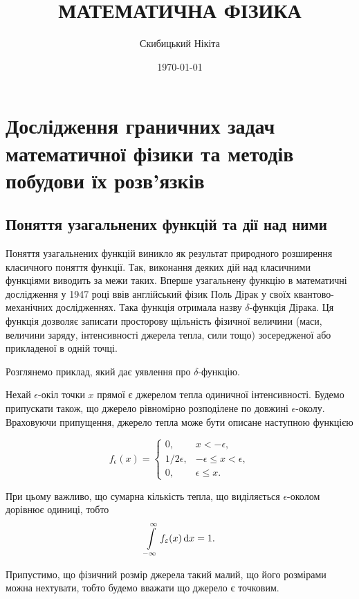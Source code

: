 

\title{{\Huge МАТЕМАТИЧНА ФІЗИКА}}
\author{Скибицький Нікіта}
\date{\today}





\tableofcontents

\setcounter{section}{3}

\section{Дослідження граничних задач математичної фізики та методів побудови їх розв'язків}

\subsection{Поняття узагальнених функцій та дії над ними}

Поняття узагальнених функцій виникло як результат природного розширення класичного поняття функції. Так, виконання деяких дій над класичними функціями виводить за межи таких. Вперше узагальнену функцію в математичні дослідження у 1947 році ввів англійський фізик Поль Дірак у своїх квантово-механічних дослідженнях. Така функція отримала назву $\delta$-функція Дірака. Ця функція дозволяє записати просторову щільність фізичної величини (маси, величини заряду, інтенсивності джерела тепла, сили тощо) зосередженої або прикладеної в одній точці. \medskip

Розглянемо приклад, який дає уявлення про $\delta$-функцію. 
\begin{example}
	Нехай $\epsilon$-окіл точки $x$ прямої є джерелом тепла одиничної інтенсивності. Будемо припускати також, що джерело рівномірно розподілене по довжині $\epsilon$-околу. Враховуючи припущення, джерело тепла може бути описане наступною функцією

	\begin{equation}
		f_\epsilon(x) = \begin{cases} 
			0, & x < - \epsilon, \\
			1 / 2 \epsilon, & - \epsilon \le x < \epsilon, \\
			0, & \epsilon \le x.
		\end{cases}
	\end{equation}
\end{example}

\begin{remark}
	При цьому важливо, що сумарна кількість тепла, що виділяється $\epsilon$-околом дорівнює одиниці, тобто
	\begin{equation}
		\displaystyle\int\limits_{-\infty}^\infty f_\varepsilon(x) \mathop{}\!\mathrm{d} x = 1.
	\end{equation}
\end{remark}
Припустимо, що фізичний розмір джерела такий малий, що його розмірами можна нехтувати, тобто будемо вважати що джерело є точковим. \medskip

